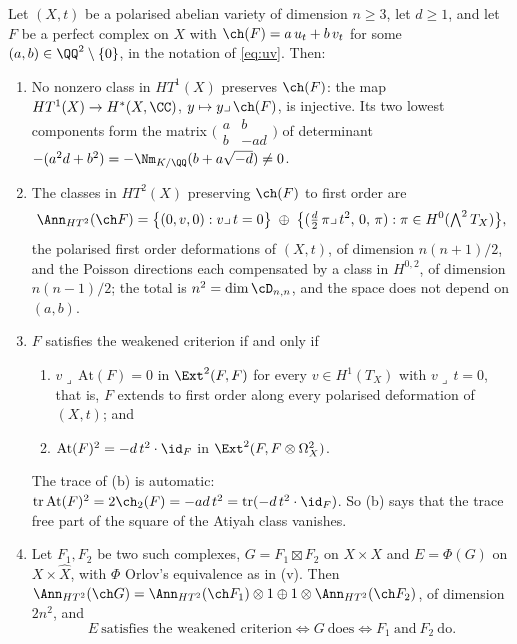 \begin{theorem}\label{thm:factor}
Let $(X,t)$ be a polarised abelian variety of dimension $n\ge3$, let $d\ge1$,
and let $F$ be a perfect complex on $X$ with
$\ch(F)=a\,u_{t}+b\,v_{t}$ for some $(a,b)\in\QQ^{2}\setminus\{0\}$, in the
notation of \eqref{eq:uv}. Then:
\begin{enumerate}[label=\textup{(\roman*)},nosep]
\item No nonzero class in $HT^{1}(X)$ preserves $\ch(F)$: the map
  $HT^{1}(X)\to H^{*}(X,\CC)$, $y\mapsto y\lrcorner\,\ch(F)$, is injective. Its
  two lowest components form the matrix
  $\bigl(\begin{smallmatrix}a&b\\ b&-ad\end{smallmatrix}\bigr)$ of
  determinant $-(a^{2}d+b^{2})=-\Nm_{K/\QQ}(b+a\sqrt{-d})\ne0$.
\item The classes in $HT^{2}(X)$ preserving $\ch(F)$ to first order are
  \begin{equation}\label{eq:secantkernel}
    \Ann_{HT^{2}}(\ch F)
    =\bigl\{(0,v,0):v\lrcorner\,t=0\bigr\}\;\oplus\;
     \bigl\{(\tfrac d2\,\pi\lrcorner\,t^{2},\,0,\,\pi):
       \pi\in H^{0}(\textstyle\bigwedge^{2}T_{X})\bigr\},
  \end{equation}
  the polarised first order deformations of $(X,t)$, of dimension $n(n+1)/2$,
  and the Poisson directions each compensated by a class in $H^{0,2}$, of
  dimension $n(n-1)/2$; the total is $n^{2}=\dim\cD_{n,n}$, and the space
  does not depend on $(a,b)$.
\item $F$ satisfies the weakened criterion if and only if
  \begin{enumerate}[label=\textup{(\alph*)},nosep]
  \item $v\lrcorner\,\mathrm{At}(F)=0$ in $\Ext^{2}(F,F)$ for every
    $v\in H^{1}(T_{X})$ with $v\lrcorner\,t=0$, that is, $F$ extends to first
    order along every polarised deformation of $(X,t)$; and
  \item $\mathrm{At}(F)^{2}=-d\,t^{2}\cdot\id_{F}$ in
    $\Ext^{2}(F,F\otimes\Omega^{2}_{X})$.
  \end{enumerate}
  The trace of (b) is automatic: $\operatorname{tr}\mathrm{At}(F)^{2}
  =2\ch_{2}(F)=-ad\,t^{2}=\operatorname{tr}(-d\,t^{2}\cdot\id_{F})$. So (b)
  says that the trace free part of the square of the Atiyah class vanishes.
\item Let $F_{1},F_{2}$ be two such complexes, $G=F_{1}\boxtimes F_{2}$ on
  $X\times X$ and $E=\Phi(G)$ on $X\times\widehat X$, with $\Phi$ Orlov's
  equivalence as in (v). Then
  $\Ann_{HT^{2}}(\ch G)=\Ann_{HT^{2}}(\ch F_{1})\otimes1\oplus
  1\otimes\Ann_{HT^{2}}(\ch F_{2})$, of dimension $2n^{2}$, and
  \[
    E\ \text{satisfies the weakened criterion}
    \iff G\ \text{does}
    \iff F_{1}\ \text{and}\ F_{2}\ \text{do}.
  \]
\end{enumerate}
\end{theorem}

